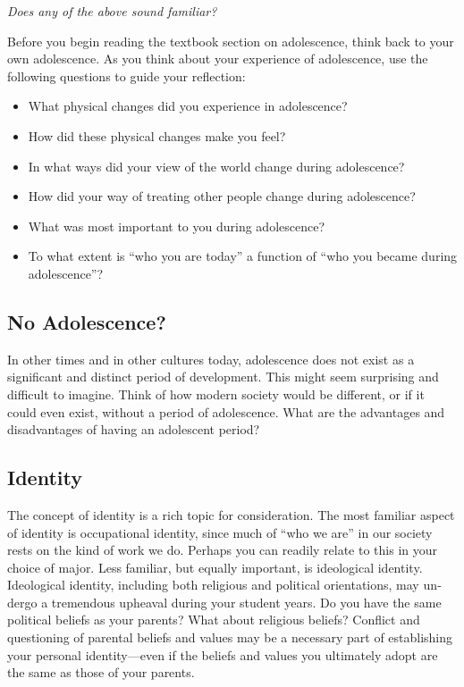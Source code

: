 \documentclass[
]{book}
\providecommand{\tightlist}{%
  \setlength{\itemsep}{0pt}\setlength{\parskip}{0pt}}
\begin{document}
\emph{Does any of the above sound familiar?}

Before you begin reading the textbook section on adolescence, think back to your own adolescence. As you think about your experience of adolescence, use the following questions to guide your reflection:

\begin{itemize}
\tightlist
\item
  What physical changes did you experience in adolescence?\\
\item
  How did these physical changes make you feel?\\
\item
  In what ways did your view of the world change during adolescence?\\
\item
  How did your way of treating other people change during adolescence?\\
\item
  What was most important to you during adolescence?\\
\item
  To what extent is ``who you are today'' a function of ``who you became during adolescence''?
\end{itemize}

\hypertarget{no-adolescence}{%
\subsection*{No Adolescence?}\label{no-adolescence}}

In other times and in other cultures to­day, adolescence does not exist as a significant and distinct period of develop­ment. This might seem surprising and difficult to imagine. Think of how modern society would be different, or if it could even exist, without a period of adolescence. What are the advantages and disadvantages of having an adolescent period?

\hypertarget{identity}{%
\subsection*{Identity}\label{identity}}

The concept of identity is a rich topic for consideration. The most familiar aspect of identity is occupational identity, since much of ``who we are'' in our society rests on the kind of work we do. Perhaps you can readily relate to this in your choice of major. Less familiar, but equally important, is ideological identity. Ideologi­cal identity, including both religious and political orientations, may un­dergo a tremen­dous upheaval during your student years. Do you have the same political beliefs as your parents? What about religious beliefs? Conflict and questioning of parental beliefs and values may be a necessary part of establishing your personal iden­tity---even if the beliefs and values you ultimately adopt are the same as those of your parents.
\end{document}
